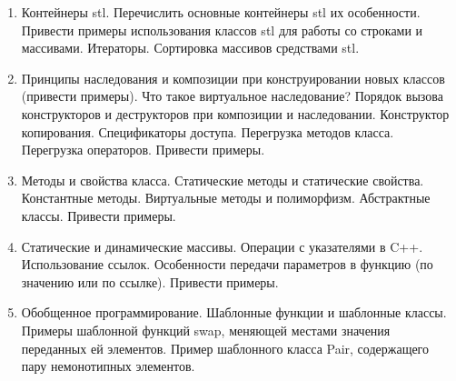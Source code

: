 % 
%

\begin{enumerate}
\item Контейнеры stl. Перечислить основные контейнеры stl их особенности. Привести примеры использования классов stl для работы со строками и массивами. Итераторы. Сортировка массивов средствами stl.

\item Принципы наследования и композиции при конструировании новых классов (привести примеры). Что такое виртуальное наследование? Порядок вызова конструкторов и деструкторов при композиции и наследовании. Конструктор копирования. Спецификаторы доступа. Перегрузка методов класса. Перегрузка операторов. Привести примеры.

\item Методы и свойства класса. Статические методы и статические свойства. Константные методы. Виртуальные методы и полиморфизм. Абстрактные классы. Привести примеры.

\item Статические и динамические массивы. Операции с указателями в C++. Использование ссылок. Особенности передачи параметров в функцию (по значению или по ссылке). Привести примеры.

\item Обобщенное программирование. Шаблонные функции и шаблонные классы. Примеры шаблонной функций swap, меняющей местами значения переданных ей элементов. Пример шаблонного класса Pair, содержащего пару немонотипных элементов.
\end{enumerate}
